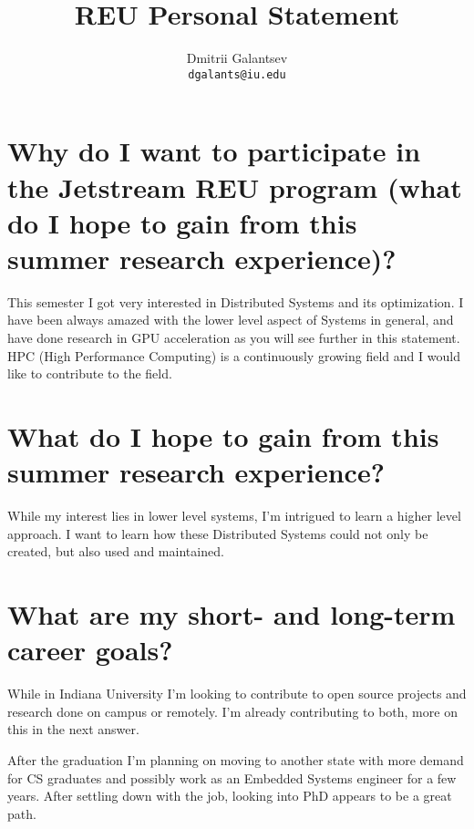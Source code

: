 \documentclass{article}
\author{
	Dmitrii Galantsev\\
	\texttt{dgalants@iu.edu}
}
\title{REU Personal Statement}
\begin{document}
\maketitle

\section{Why do I want to participate in the Jetstream REU program (what do I hope to gain from this summer research experience)?}
This semester I got very interested in Distributed Systems and its optimization. I have been always amazed with the lower level aspect of Systems in general, and have done research in GPU acceleration as you will see further in this statement. HPC (High Performance Computing) is a continuously growing field and I would like to contribute to the field.

\section{What do I hope to gain from this summer research experience?}
While my interest lies in lower level systems, I'm intrigued to learn a higher level approach. I want to learn how these Distributed Systems could not only be created, but also used and maintained.

\section{What are my short- and long-term career goals?}
While in Indiana University I'm looking to contribute to open source projects and research done on campus or remotely. I'm already contributing to both, more on this in the next answer.\par
After the graduation I'm planning on moving to another state with more demand for CS graduates and possibly work as an Embedded Systems engineer for a few years. After settling down with the job, looking into PhD appears to be a great path.
\end{document}

